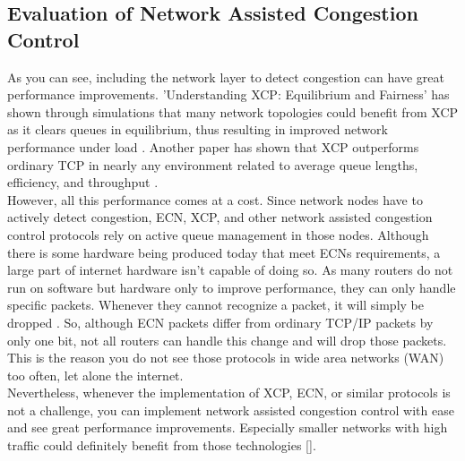 \documentclass[a4paper,conference]{IEEEtran}
\begin{document}
\subsection{Evaluation of Network Assisted Congestion Control}
As you can see, including the network layer to detect congestion can have great performance improvements. 'Understanding XCP: Equilibrium and Fairness' has shown through simulations that many network topologies could benefit from XCP as it clears queues in equilibrium, thus resulting in improved network performance under load \cite{1498331}. Another paper has shown that XCP outperforms ordinary TCP in nearly any environment related to average queue lengths, efficiency, and throughput \cite{katabi2002congestion}.
\\However, all this performance comes at a cost. Since network nodes have to actively detect congestion, ECN, XCP, and other network assisted congestion control protocols rely on active queue management in those nodes. Although there is some hardware being produced today that meet ECNs requirements, a large part of internet hardware isn't capable of doing so. As many routers do not run on software but hardware only to improve performance, they can only handle specific packets. Whenever they cannot recognize a packet, it will simply be dropped \cite{katabi2002congestion}. So, although ECN packets differ from ordinary TCP/IP packets by only one bit, not all routers can handle this change and will drop those packets. This is the reason you do not see those protocols in wide area networks (WAN) too often, let alone the internet.
\\Nevertheless, whenever the implementation of XCP, ECN, or similar protocols is not a challenge, you can implement network assisted congestion control with ease and see great performance improvements. Especially smaller networks with high traffic could definitely benefit from those technologies [].
\end{document}

